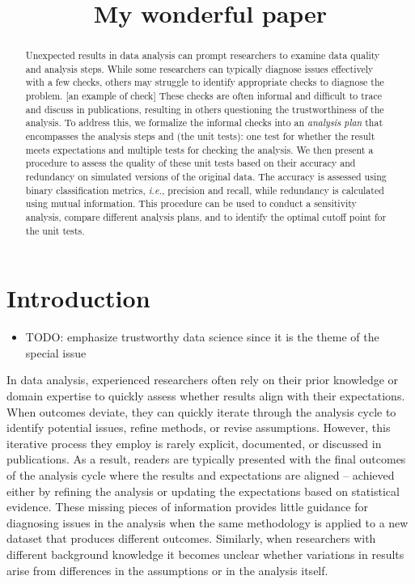 \documentclass[
]{jds}
\title{My wonderful paper}
\author{}
\date{}
\providecommand{\tightlist}{%
  \setlength{\itemsep}{0pt}\setlength{\parskip}{0pt}}\usepackage{longtable,booktabs,array}
\renewcommand*\contentsname{Table of contents}
\newcommand\contentsname{Table of contents}
\begin{document}
\maketitle
\begin{abstract}
Unexpected results in data analysis can prompt researchers to examine
data quality and analysis steps. While some researchers can typically
diagnose issues effectively with a few checks, others may struggle to
identify appropriate checks to diagnose the problem. {[}an example of
check{]} These checks are often informal and difficult to trace and
discuss in publications, resulting in others questioning the
trustworthiness of the analysis. To address this, we formalize the
informal checks into an \emph{analysis plan} that encompasses the
analysis steps and (the unit tests): one test for whether the result
meets expectations and multiple tests for checking the analysis. We then
present a procedure to assess the quality of these unit tests based on
their accuracy and redundancy on simulated versions of the original
data. The accuracy is assessed using binary classification metrics,
\emph{i.e.}, precision and recall, while redundancy is calculated using
mutual information. This procedure can be used to conduct a sensitivity
analysis, compare different analysis plans, and to identify the optimal
cutoff point for the unit tests.
\end{abstract}

\renewcommand*\contentsname{Table of contents}
{
\hypersetup{linkcolor=}
\setcounter{tocdepth}{3}
\tableofcontents
}

\newpage

\section{Introduction}\label{introduction}

\begin{itemize}
\tightlist
\item
  TODO: emphasize trustworthy data science since it is the theme of the
  special issue
\end{itemize}

In data analysis, experienced researchers often rely on their prior
knowledge or domain expertise to quickly assess whether results align
with their expectations. When outcomes deviate, they can quickly iterate
through the analysis cycle to identify potential issues, refine methods,
or revise assumptions. However, this iterative process they employ is
rarely explicit, documented, or discussed in publications. As a result,
readers are typically presented with the final outcomes of the analysis
cycle where the results and expectations are aligned -- achieved either
by refining the analysis or updating the expectations based on
statistical evidence. These missing pieces of information provides
little guidance for diagnosing issues in the analysis when the same
methodology is applied to a new dataset that produces different
outcomes. Similarly, when researchers with different background
knowledge it becomes unclear whether variations in results arise from
differences in the assumptions or in the analysis itself.
\end{document}
